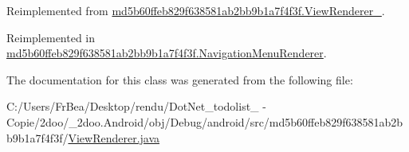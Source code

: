 Reimplemented from \hyperlink{classmd5b60ffeb829f638581ab2bb9b1a7f4f3f_1_1_view_renderer__2_6c151401977148a92c515e9c7de1aaf8}{md5b60ffeb829f638581ab2bb9b1a7f4f3f.ViewRenderer\_}.

Reimplemented in \hyperlink{classmd5b60ffeb829f638581ab2bb9b1a7f4f3f_1_1_navigation_menu_renderer_717e3e89de8a97cac2daee362f553abe}{md5b60ffeb829f638581ab2bb9b1a7f4f3f.NavigationMenuRenderer}.

The documentation for this class was generated from the following file:\begin{CompactItemize}
\item 
C:/Users/FrBea/Desktop/rendu/DotNet\_\-todolist\_ - Copie/2doo/\_\-2doo.Android/obj/Debug/android/src/md5b60ffeb829f638581ab2bb9b1a7f4f3f/\hyperlink{_view_renderer_8java}{ViewRenderer.java}\end{CompactItemize}
